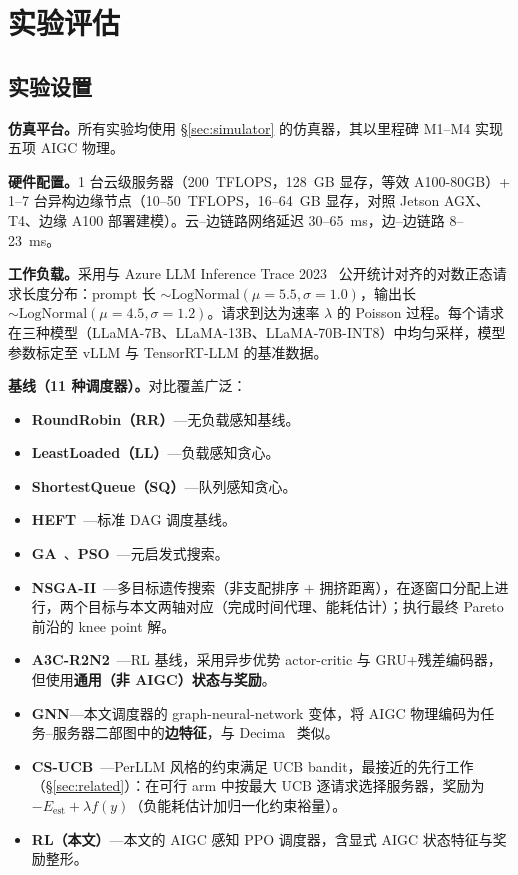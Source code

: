 \section{实验评估}
\label{sec:eval}

\subsection{实验设置}
\label{sec:eval-setup}

\textbf{仿真平台。}所有实验均使用 \S\ref{sec:simulator} 的仿真器，其以里程碑 M1--M4 实现五项 AIGC 物理。

\textbf{硬件配置。}1 台云级服务器（200~TFLOPS，128~GB 显存，等效 A100-80GB）+ 1--7 台异构边缘节点（10--50~TFLOPS，16--64~GB 显存，对照 Jetson AGX、T4、边缘 A100 部署建模）。云--边链路网络延迟 30--65~ms，边--边链路 8--23~ms。

\textbf{工作负载。}采用与 Azure LLM Inference Trace 2023~\cite{azure2023llmtrace} 公开统计对齐的对数正态请求长度分布：prompt 长 $\sim \text{LogNormal}(\mu{=}5.5, \sigma{=}1.0)$，输出长 $\sim \text{LogNormal}(\mu{=}4.5, \sigma{=}1.2)$。请求到达为速率 $\lambda$ 的 Poisson 过程。每个请求在三种模型（LLaMA-7B、LLaMA-13B、LLaMA-70B-INT8）中均匀采样，模型参数标定至 vLLM 与 TensorRT-LLM 的基准数据。

\textbf{基线（11 种调度器）。}对比覆盖广泛：
\begin{itemize}
\item \textbf{RoundRobin（RR）}---无负载感知基线。
\item \textbf{LeastLoaded（LL）}---负载感知贪心。
\item \textbf{ShortestQueue（SQ）}---队列感知贪心。
\item \textbf{HEFT}~\cite{topcuoglu2002heft}---标准 DAG 调度基线。
\item \textbf{GA}~\cite{holland1975adaptation}、\textbf{PSO}~\cite{kennedy1995pso}---元启发式搜索。
\item \textbf{NSGA-II}~\cite{yu2025llmrouting}---多目标遗传搜索（非支配排序 + 拥挤距离），在逐窗口分配上进行，两个目标与本文两轴对应（完成时间代理、能耗估计）；执行最终 Pareto 前沿的 knee point 解。
\item \textbf{A3C-R2N2}~\cite{tuli2022a3cr2n}---RL 基线，采用异步优势 actor-critic 与 GRU+残差编码器，但使用\textbf{通用（非 AIGC）状态与奖励}。
\item \textbf{GNN}---本文调度器的 graph-neural-network 变体，将 AIGC 物理编码为任务--服务器二部图中的\textbf{边特征}，与 Decima~\cite{mao2019decima} 类似。
\item \textbf{CS-UCB}~\cite{yang2024perllm}---PerLLM 风格的约束满足 UCB bandit，最接近的先行工作（\S\ref{sec:related}）：在可行 arm 中按最大 UCB 逐请求选择服务器，奖励为 $-E_{\text{est}} + \lambda f(y)$（负能耗估计加归一化约束裕量）。
\item \textbf{RL（本文）}---本文的 AIGC 感知 PPO 调度器，含显式 AIGC 状态特征与奖励整形。
\end{itemize}

